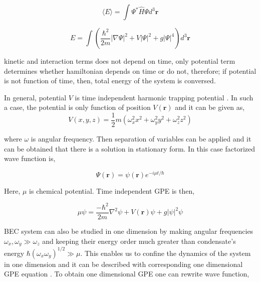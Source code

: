 \documentclass[a4paper,times,12pt]{article}
\begin{document}
\begin{equation}
\label{GPE_total_energy_general}
\langle E \rangle = \int \Psi^{*}\hat{H}\Psi d^3\boldsymbol{r}
\end{equation}

\begin{equation}
\label{GPE_total_energy}
E = \int \left(\frac {\hbar^2}{2m}|\nabla
\Psi|^2 + V|\Psi|^2 + g|\Psi|^4 \right) d^3\boldsymbol{r}
\end{equation}

\noindent kinetic and interaction terms does not depend on time, only potential term determines whether hamiltonian depends on time or do not, therefore; if potential is not function of time, then, total energy of the system is conversed.

In general, potential $V$ is time independent harmonic trapping potential \cite{barenghi2016primer}. In such a case, the potential is only function of position $V(\boldsymbol{r})$ and it can be given as,
\begin{equation}
\label{eq:GPE_harmonic_potential}
V(x, y, z) = \frac{1}{2}m(\omega_x^2 x^2 + \omega_y^2y^2 + \omega_z^2z^2)
\end{equation}


\noindent where $\omega$ is angular frequency. Then separation of variables can be applied and it can be obtained that there is a solution in stationary form. In this case factorized wave function is,

\begin{equation}
\label{eq:GPE_time_indep_wave_func}
\Psi(\boldsymbol{r}) = \psi(\boldsymbol{r})e^{-i\mu t/\hbar}
\end{equation}

\noindent Here, $\mu$ is chemical potential. Time independent GPE is then,

\begin{equation}
\label{eq:GPE_time_indep}
\mu\psi = \frac{-\hbar^2}{2m}\nabla^2\psi + V(\boldsymbol{r})\psi + g|\psi|^2\psi 
\end{equation}

BEC system can also be studied in one dimension by making angular frequencies $\omega_x, \omega_y \gg \omega_z$ and keeping their energy order much greater than condensate's energy $ \hbar(\omega_x \omega_y)^{1/2} \gg \mu $. This enables us to confine the dynamics of the system in one dimension and it can be described with corresponding one dimensional GPE equation \cite{barenghi2016primer}. To obtain one dimensional GPE one can rewrite wave function,
\end{document}
